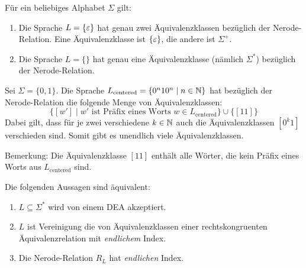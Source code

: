 \begin{Bsp}
      Für ein beliebiges Alphabet $\Sigma$ gilt:
      \begin{enumerate}
       \item Die Sprache $L=\{\varepsilon\}$ hat genau zwei Äquivalenzklassen bezüglich der Nerode-Relation.
      Eine Äquivalenzklasse ist $\{\varepsilon\}$, die andere ist $\Sigma^+$.
       \item Die Sprache $L=\{\}$ hat genau eine Äquivalenzklasse (nämlich $\Sigma^*$) bezüglich der Nerode-Relation.
       \qedhere
      \end{enumerate}
\end{Bsp}

\begin{Bsp}
Sei $\Sigma=\{0,1\}$. Die Sprache $L_\text{centered}=\{0^n10^n \mid n\in\mathbb{N}\}$ hat bezüglich der Nerode-Relation die folgende Menge von Äquivalenzklassen:
$$\{ [w'] \mid w' \text{ ist Präfix eines Worts } w\in L_\text{centered}\} \cup \{ [11] \}$$
Dabei gilt, dass für je zwei verschiedene $k\in\mathbb{N}$
auch die Äquivalenzklassen $[0^k1]$ verschieden sind. Somit gibt es unendlich viele Äquivalenzklassen.

Bemerkung: Die Äquivalenzklasse $[11]$ enthält alle Wörter, die kein Präfix eines Worts aus $L_\text{centered}$ sind.
\end{Bsp}


\begin{Satz} %
        Die folgenden Aussagen sind äquivalent:
        \begin{enumerate}
                \item\label{itm:Nerode1} $L\subseteq \Sigma^*$ wird von einem \ac{DEA} akzeptiert.
                \item\label{itm:Nerode2} $L$ ist Vereinigung die von Äquivalenzklassen einer rechtskongruenten Äquivalenzrelation mit \emph{endlichem} Index.
                \item\label{itm:Nerode3} Die Nerode-Relation $R_L$ hat \emph{endlichen} Index.
                \qedhere
        \end{enumerate}
\end{Satz}

